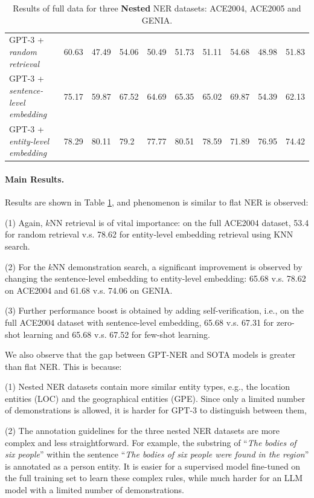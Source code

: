 \documentclass{article}
\begin{document}
\begin{table}[th!]
{\begin{tabular}{llllllllll}
        GPT-3 + \textit{random retrieval} & 60.63 & 47.49 & 54.06 & 50.49 & 51.73 & 51.11 & 54.68 & 48.98 & 51.83 \\
        GPT-3 + \textit{sentence-level embedding} & 75.17 & 59.87 & 67.52 & 64.69 & 65.35 & 65.02 & 69.87 & 54.39 & 62.13 \\
        GPT-3 + \textit{entity-level embedding} & 78.29 & 80.11 & 79.2 & 77.77 & 80.51 & 78.59 & 71.89 & 76.95 & 74.42 \\\bottomrule
    \end{tabular}
    }
     \caption{Results of full data for three \textbf{Nested} NER datasets: ACE2004, ACE2005 and GENIA.}
    \label{tab:nest_ner_result}
\end{table}



\paragraph{Main Results.}

Results are shown in Table \ref{tab:nest_ner_result}, and phenomenon is similar to flat NER is observed: 

(1) Again, $k$NN retrieval is of vital importance: on the full ACE2004 dataset, 53.4 for random retrieval v.s. 78.62 for entity-level embedding retrieval using KNN search.

(2) For the $k$NN demonstration search, a significant improvement is observed by changing the sentence-level embedding to entity-level embedding: 65.68 v.s. 78.62 on  ACE2004  and 61.68 v.s. 74.06 on  GENIA.

(3)  Further performance boost is obtained by adding self-verification, i.e., on the full ACE2004 dataset with sentence-level embedding, 65.68 v.s. 67.31 for zero-shot learning and 65.68 v.s. 67.52 for few-shot learning.

We also observe that the gap between  GPT-NER  and SOTA models is greater than flat NER. This is because:

(1) Nested NER datasets contain more similar entity types, e.g., the location entities (LOC) and the geographical entities (GPE). 
Since only a limited number of demonstrations is allowed, it is harder for GPT-3 to distinguish between them, 

(2) The annotation guidelines for the three nested NER datasets are more complex and less straightforward. 
For example, the substring of  “\textit{The bodies of six people}”  within the sentence “\textit{The bodies of six people were found in the region}” is annotated as a person entity. 
It is easier for
a supervised model fine-tuned on the full training set to learn these complex rules, while much harder for an LLM model with a limited number of demonstrations.
\end{document}
